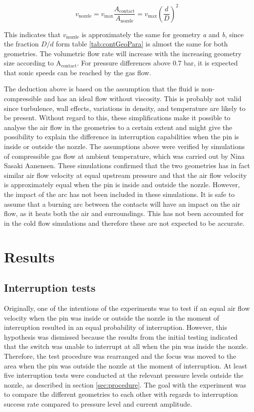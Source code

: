 \documentclass[10pt,a4paper,twoside]{article}
\begin{document}
\begin{equation} \label{eq:VolumetricFlow}
v_\mathrm{{nozzle}}= v_\mathrm{{max}}\frac{A_\mathrm{{contact}}}{A_\mathrm{{nozzle}} }= v_\mathrm{{max}} \left(\frac{d}{D}\right)^2
\end{equation} 

This indicates that $v_\mathrm{{nozzle}}$ is approximately the same for geometry \textit{a} and \textit{b}, since the fraction $D/d$ form table \ref{tab:contGeoPara} is almost the same for both geometries. The volumetric flow rate will increase with the increasing geometry size according to A$_\mathrm{{contact}}$. For pressure differences above 0.7 bar, it is expected that sonic speeds can be reached by the gas flow.

The deduction above is based on the assumption that the fluid is non-compressible and has an ideal flow without viscosity. This is probably not valid since turbulence, wall effects, variations in density, and temperature are likely to be present. Without regard to this, these simplifications make it possible to analyse the air flow in the geometries to a certain extent and might give the possibility to explain the difference in interruption capabilities when the pin is inside or outside the nozzle. The assumptions above were verified by simulations of compressible gas flow at ambient temperature, which was carried out by Nina Sasaki Aanensen. These simulations confirmed that the two geometries has in fact similar air flow velocity at equal upstream pressure and that the air flow velocity is approximately equal when the pin is inside and outside the nozzle. However, the impact of the arc has not been included in these simulations. It is safe to assume that a burning arc between the contacts will have an impact on the air flow, as it heats both the air and surroundings. This has not been accounted for in the cold flow simulations and therefore these are not expected to be accurate.

\cleardoublepage

\section{Results}
\subsection{Interruption tests} \label{sec:interChance}
Originally, one of the intentions of the experiments was to test if an equal air flow velocity when the pin was inside or outside the nozzle in the moment of interruption resulted in an equal probability of interruption. However, this hypothesis was dismissed because the results from the initial testing indicated that the switch was unable to interrupt at all when the pin was inside the nozzle. Therefore, the test procedure was rearranged and the focus was moved to the area when the pin was outside the nozzle at the moment of interruption. At least five interruption tests were conducted at the relevant pressure levels outside the nozzle, as described in section \ref{sec:procedure}. The goal with the experiment was to compare the different geometries to each other with regards to interruption success rate compared to pressure level and current amplitude.
\end{document}
